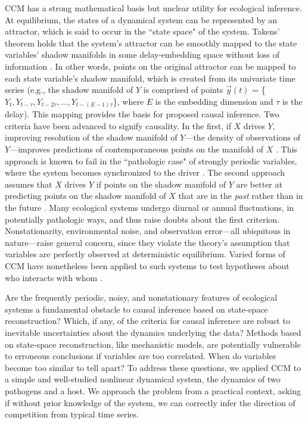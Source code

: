 \documentclass[10pt]{article}
\begin{document}
CCM has a strong mathematical basis but unclear utility for ecological inference. 
At equilibrium, the states of a dynamical system can be represented by an attractor, which is said to occur in the ``state space" of the system. 
Takens' theorem holds that the system's attractor can be smoothly mapped to the state variables' shadow manifolds in some delay-embedding space without loss of information \cite{Takens1981}.
In other words, points on the original attractor can be mapped to each state variable's shadow manifold, which is created from its univariate time series (e.g., the shadow manifold of $Y$ is comprised of points $\vec{y}(t)$ = \{$Y_t, Y_{t-\tau}, Y_{t-2\tau},...,Y_{t-(E-1)\tau}$\}, where $E$ is the embedding dimension and $\tau$ is the delay).
This mapping provides the basis for proposed causal inference. 
Two criteria have been advanced to signify causality.
In the first, if $X$ drives $Y$, improving resolution of the shadow manifold of $Y$---the density of observations of $Y$---improves predictions of contemporaneous points on the manifold of $X$ \cite{Sugihara2012}.
This approach is known to fail in the ``pathologic case" \cite{Sugihara2012} of strongly periodic variables, where the system becomes synchronized to the driver \cite{Kocarev1996}.
The second approach assumes that $X$ drives $Y$ if points on the shadow manifold of $Y$ are better at predicting points on the shadow manifold of $X$ that are in the \textit{past} rather than in the future \cite{Ye2015}.
Many ecological systems undergo diurnal or annual fluctuations, in potentially pathologic ways, and thus raise doubts about the first criterion.
Nonstationarity, environmental noise, and observation error---all ubiquitous in nature---raise general concern, since they violate the theory's assumption that variables are perfectly observed at deterministic equilibrium. 
Varied forms of CCM have nonetheless been applied to such systems to test hypotheses about who interacts with whom \cite{Ye2015, Sugihara2012, Tajima2015, Tsonis2015}.
 
Are the frequently periodic, noisy, and nonstationary features of ecological systems a fundamental obstacle to causal inference based on state-space reconstruction?
Which, if any, of the criteria for causal inference are robust to inevitable uncertainties about the dynamics underlying the data?
Methods based on state-space reconstruction, like mechanistic models, are potentially vulnerable to erroneous conclusions if variables are too correlated.
When do variables become too similar to tell apart?
To address these questions, we applied CCM to a simple and well-studied nonlinear dynamical system, the dynamics of two pathogens and a host.
We approach the problem from a practical context, asking if without prior knowledge of the system, we can correctly infer the direction of competition from typical time series.
\end{document}
